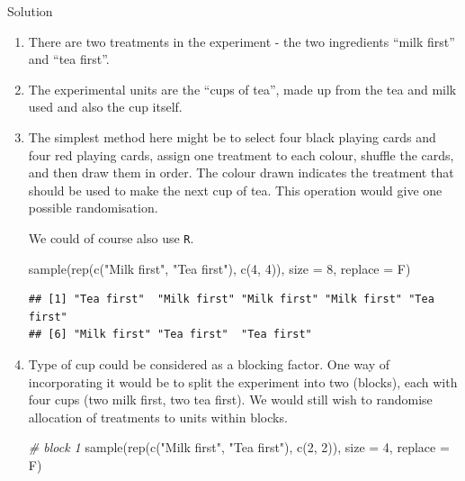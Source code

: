 \documentclass[
]{book}
\newenvironment{Shaded}{\begin{snugshade}}{\end{snugshade}}
\newcommand{\AttributeTok}[1]{\textcolor[rgb]{0.77,0.63,0.00}{#1}}
\newcommand{\CommentTok}[1]{\textcolor[rgb]{0.56,0.35,0.01}{\textit{#1}}}
\newcommand{\DecValTok}[1]{\textcolor[rgb]{0.00,0.00,0.81}{#1}}
\newcommand{\FunctionTok}[1]{\textcolor[rgb]{0.00,0.00,0.00}{#1}}
\newcommand{\NormalTok}[1]{#1}
\newcommand{\StringTok}[1]{\textcolor[rgb]{0.31,0.60,0.02}{#1}}
\theoremstyle{definition}
\theoremstyle{definition}
\theoremstyle{definition}
\theoremstyle{definition}
\theoremstyle{remark}
\begin{document}
Solution

\begin{enumerate}
\def\labelenumi{\alph{enumi}.}
\item
  There are two treatments in the experiment - the two ingredients ``milk first'' and ``tea first''.
\item
  The experimental units are the ``cups of tea'', made up from the tea and milk used and also the cup itself.
\item
  The simplest method here might be to select four black playing cards and four red playing cards, assign one treatment to each colour, shuffle the cards, and then draw them in order. The colour drawn indicates the treatment that should be used to make the next cup of tea. This operation would give one possible randomisation.

  We could of course also use \texttt{R}.

\begin{Shaded}
\begin{Highlighting}[]
\FunctionTok{sample}\NormalTok{(}\FunctionTok{rep}\NormalTok{(}\FunctionTok{c}\NormalTok{(}\StringTok{"Milk first"}\NormalTok{, }\StringTok{"Tea first"}\NormalTok{), }\FunctionTok{c}\NormalTok{(}\DecValTok{4}\NormalTok{, }\DecValTok{4}\NormalTok{)), }\AttributeTok{size =} \DecValTok{8}\NormalTok{, }\AttributeTok{replace =}\NormalTok{ F)}
\end{Highlighting}
\end{Shaded}

\begin{verbatim}
## [1] "Tea first"  "Milk first" "Milk first" "Milk first" "Tea first" 
## [6] "Milk first" "Tea first"  "Tea first"
\end{verbatim}
\item
  Type of cup could be considered as a blocking factor. One way of incorporating it would be to split the experiment into two (blocks), each with four cups (two milk first, two tea first). We would still wish to randomise allocation of treatments to units within blocks.

\begin{Shaded}
\begin{Highlighting}[]
\CommentTok{\# block 1}
\FunctionTok{sample}\NormalTok{(}\FunctionTok{rep}\NormalTok{(}\FunctionTok{c}\NormalTok{(}\StringTok{"Milk first"}\NormalTok{, }\StringTok{"Tea first"}\NormalTok{), }\FunctionTok{c}\NormalTok{(}\DecValTok{2}\NormalTok{, }\DecValTok{2}\NormalTok{)), }\AttributeTok{size =} \DecValTok{4}\NormalTok{, }\AttributeTok{replace =}\NormalTok{ F)}
\end{Highlighting}
\end{Shaded}


\end{enumerate}
\end{document}
